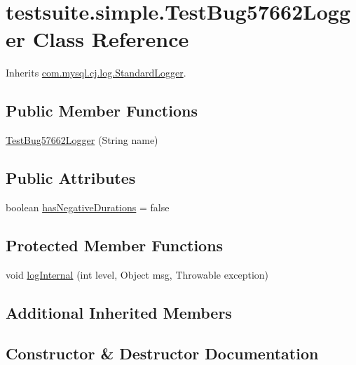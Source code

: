 \hypertarget{classtestsuite_1_1simple_1_1_test_bug57662_logger}{}\section{testsuite.\+simple.\+Test\+Bug57662\+Logger Class Reference}
\label{classtestsuite_1_1simple_1_1_test_bug57662_logger}


Inherits \mbox{\hyperlink{classcom_1_1mysql_1_1cj_1_1log_1_1_standard_logger}{com.\+mysql.\+cj.\+log.\+Standard\+Logger}}.

\subsection*{Public Member Functions}
\begin{DoxyCompactItemize}
\item 
\mbox{\hyperlink{classtestsuite_1_1simple_1_1_test_bug57662_logger_ad5de5a966ebc1284ca35c4cac0812573}{Test\+Bug57662\+Logger}} (String name)
\end{DoxyCompactItemize}
\subsection*{Public Attributes}
\begin{DoxyCompactItemize}
\item 
boolean \mbox{\hyperlink{classtestsuite_1_1simple_1_1_test_bug57662_logger_a1a1fd2583e436da2a249404307099ebd}{has\+Negative\+Durations}} = false
\end{DoxyCompactItemize}
\subsection*{Protected Member Functions}
\begin{DoxyCompactItemize}
\item 
void \mbox{\hyperlink{classtestsuite_1_1simple_1_1_test_bug57662_logger_a7b8828ab839d0c5353bf8f4b784789ce}{log\+Internal}} (int level, Object msg, Throwable exception)
\end{DoxyCompactItemize}
\subsection*{Additional Inherited Members}


\subsection{Constructor \& Destructor Documentation}
\mbox{\label{classtestsuite_1_1simple_1_1_test_bug57662_logger_ad5de5a966ebc1284ca35c4cac0812573}} 

